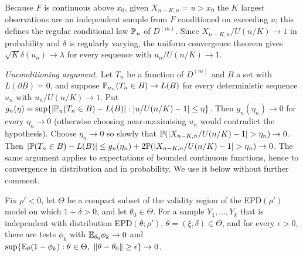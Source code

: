 Because $F$ is continuous above $x_0$, given $X_{n-K,n}=u>x_0$ the $K$ largest observations are
an independent sample from $F$ conditioned on exceeding $u$; this defines the regular conditional
law $\mathbb{P}_u$ of $D^{(m)}$. Since $X_{n-K,n}/U(n/K)\to1$ in probability and $\delta$ is regularly
varying, the uniform convergence theorem gives $\sqrt K\delta(u_n)\to\lambda$ for every sequence
with $u_n/U(n/K)\to1$.

\emph{Unconditioning argument.} Let $T_n$ be a function of $D^{(m)}$ and $B$ a set with
$L(\partial B)=0$, and suppose $\mathbb{P}_{u_n}(T_n\in B)\to L(B)$ for every deterministic sequence
$u_n$ with $u_n/U(n/K)\to1$. Put
$g_n(\eta)=\sup\{|\mathbb{P}_u(T_n\in B)-L(B)|:|u/U(n/K)-1|\le\eta\}$. Then $g_n(\eta_n)\to0$ for
every $\eta_n\to0$ (otherwise choosing near-maximising $u_n$ would contradict the hypothesis).
Choose $\eta_n\to0$ so slowly that $\Prob(|X_{n-K,n}/U(n/K)-1|>\eta_n)\to0$. Then
$|\Prob(T_n\in B)-L(B)|\le g_n(\eta_n)+2\Prob(|X_{n-K,n}/U(n/K)-1|>\eta_n)\to0$. The same
argument applies to expectations of bounded continuous functions, hence to convergence in
distribution and in probability. We use it below without further comment.


\begin{lemma}\label{lem:tests}
Fix $\rho'<0$, let $\Theta$ be a compact subset of the validity region of the EPD$(\rho')$ model
on which $1+\delta>0$, and let $\theta_0\in\Theta$. For a sample $Y_1,\dots,Y_k$ that is independent
with distribution EPD$(\theta;\rho')$, $\theta=(\xi,\delta)\in\Theta$, and for every $\epsilon>0$,
there are tests $\phi_k$ with $\mathbb{E}_{\theta_0}\phi_k\to0$ and
$\sup\{\E_\theta(1-\phi_k):\theta\in\Theta,\ \|\theta-\theta_0\|\ge\epsilon\}\to0$.
\end{lemma}

